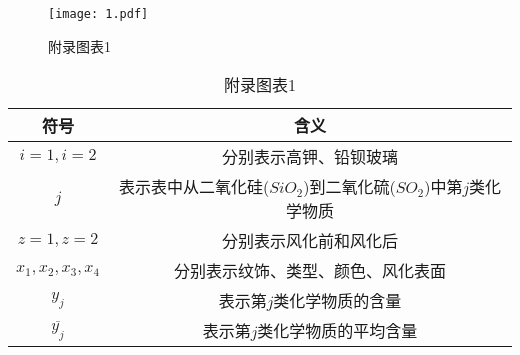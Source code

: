 \begin{figure}[H] 
	\centering 
	\texttt{[image: 1.pdf]} 
	\caption{附录图表1} 
	\label{fig3} 
\end{figure}


\begin{table}[H]
	\centering
	\caption{附录图表1}
	\begin{tabular}{c c}
		\toprule[1.5pt]
		符号 & 含义  \\ 
		\midrule[1pt]
		$i=1,i=2$ & 分别表示高钾、铅钡玻璃 \\ 
		$j$ & 表示表中从二氧化硅($SiO_2$)到二氧化硫($SO_2$)中第$j$类化学物质 \\
		$z=1,z=2$ & 分别表示风化前和风化后 \\
		$x_1,x_2,x_3,x_4$ & 分别表示纹饰、类型、颜色、风化表面 \\
		$y_j$ & 表示第$j$类化学物质的含量 \\ 
		$\overline{y_j}$ & 表示第$j$类化学物质的平均含量 \\  
		\toprule[1.5pt]
	\end{tabular}
\end{table} 